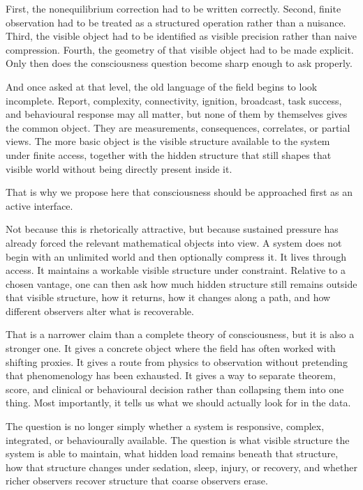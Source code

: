 \documentclass[11pt,a4paper]{article}
\numberwithin{equation}{section}
\theoremstyle{thmcompact}
\theoremstyle{remark}
\begin{document}
First, the nonequilibrium correction had to be written correctly. Second, finite observation had to be treated as a structured operation rather than a nuisance. Third, the visible object had to be identified as visible precision rather than naive compression. Fourth, the geometry of that visible object had to be made explicit. Only then does the consciousness question become sharp enough to ask properly.

And once asked at that level, the old language of the field begins to look incomplete. Report, complexity, connectivity, ignition, broadcast, task success, and behavioural response may all matter, but none of them by themselves gives the common object. They are measurements, consequences, correlates, or partial views. The more basic object is the visible structure available to the system under finite access, together with the hidden structure that still shapes that visible world without being directly present inside it.

That is why we propose here that consciousness should be approached first as an active interface.

Not because this is rhetorically attractive, but because sustained pressure has already forced the relevant mathematical objects into view. A system does not begin with an unlimited world and then optionally compress it. It lives through access. It maintains a workable visible structure under constraint. Relative to a chosen vantage, one can then ask how much hidden structure still remains outside that visible structure, how it returns, how it changes along a path, and how different observers alter what is recoverable.

That is a narrower claim than a complete theory of consciousness, but it is also a stronger one. It gives a concrete object where the field has often worked with shifting proxies. It gives a route from physics to observation without pretending that phenomenology has been exhausted. It gives a way to separate theorem, score, and clinical or behavioural decision rather than collapsing them into one thing. Most importantly, it tells us what we should actually look for in the data.

The question is no longer simply whether a system is responsive, complex, integrated, or behaviourally available. The question is what visible structure the system is able to maintain, what hidden load remains beneath that structure, how that structure changes under sedation, sleep, injury, or recovery, and whether richer observers recover structure that coarse observers erase.
\end{document}
